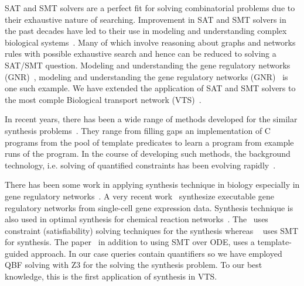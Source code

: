 SAT and SMT solvers are a perfect fit for solving combinatorial problems due to their exhaustive nature of searching. 
%
Improvement in SAT and SMT solvers in the past decades have led to their use in modeling and understanding complex biological systems~\cite{heule2010exact,yordanov2013smt,mangla2010timing}. 
%
Many of which involve reasoning about graphs and networks rules with possible exhaustive search and hence can be reduced to solving a SAT/SMT question. 
%
Modeling and understanding the gene regulatory networks (GNR)~\cite{guerra2012reasoning,chin2008biographe}, modeling and understanding the gene regulatory networks (GNR)~\cite{giacobbe2015model,rosenblueth2014inference, batt2010efficient, yordanov2016method, dunn2014defining, paoletti2014analyzing, koksal2013synthesis} is one such example. 
%
We have extended the application of SAT and SMT solvers to the most comple Biological transport network (VTS)~\cite{mani2016stacking,shukla}. 

In recent years, there has been a wide range of methods
developed for the similar synthesis problems~\cite{sketch,sygus,exampleSynth}.
%
They range from filling gaps an implementation of C programs from the pool of template predicates to learn a program from example
runs of the program.
%
In the course of developing such methods,
the background technology, i.e. solving of quantified
constraints has been evolving rapidly~\cite{lonsing2010depqbf,z3Quant}.
%

There has been some work in
applying synthesis technique in biology especially in gene regulatory networks~\cite{shavit2016automated, fisher2015synthesising}. A very recent work~\cite{fisher2015synthesising} synthesize executable gene regulatory networks from single-cell gene expression data.
Synthesis technique is also used in optimal synthesis for chemical reaction networks~\cite{cardelli2017syntax}. The~\cite{fisher2015synthesising} uses constraint (satisfiability) solving techniques for the synthesis whereas ~\cite{shavit2016automated} uses SMT for synthesis. The paper~\cite{cardelli2017syntax} in addition to using SMT over ODE, uses a template-guided approach. In our case queries contain quantifiers so we have employed QBF solving with Z3 for the solving the synthesis problem. To our best knowledge, this is the first application of synthesis in VTS.

~        

